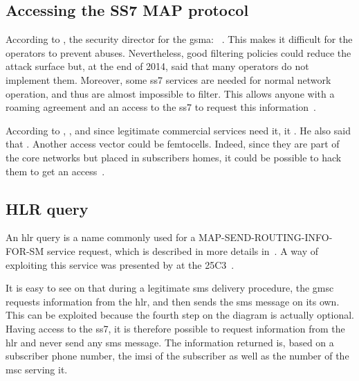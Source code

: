     \subsection{Accessing the SS7 MAP protocol}

      According to , the security director for the
      \gls{gsma}: ~\cite{timberg_for_2014}. This makes
      it difficult for the operators to prevent abuses. Nevertheless,
      good filtering policies could reduce the attack surface but, at
      the end of 2014,  said that many operators do
      not implement them. Moreover, some \gls{ss7} services are needed
      for normal network operation, and thus are almost impossible to
      filter. This allows anyone with a roaming agreement and an access
      to the \gls{ss7} to request this
      information~\cite{nohl_mobile_2014}.

      According to , , and since legitimate commercial services
      need it, it . He also said that
      . Another access vector could be femtocells.
      Indeed, since they are part of the core networks but placed in
      subscribers homes, it could be possible to hack them to get an
      access~\cite{engel_ss7:_2014}.

    \subsection{HLR query}
    \label{sssection:hlr_query}

      An \gls{hlr} query is a name commonly used for a
      MAP-SEND-ROUTING-INFO-FOR-SM service request, which is described
      in more details in~. A way of exploiting this
      service was presented by  at the
      25C3~\cite{engel_locating_2008}.

      It is easy to see on  that during a
      legitimate \gls{sms} delivery procedure, the \gls{gmsc} requests
      information from the \gls{hlr}, and then sends the \gls{sms}
      message on its own. This can be exploited because the fourth step on
      the diagram is actually optional. Having access to the \gls{ss7},
      it is therefore possible to request information from the \gls{hlr}
      and never send any \gls{sms} message. The information returned is,
      based on a subscriber phone number, the \gls{imsi} of the
      subscriber as well as the number of the \gls{msc} serving it.

